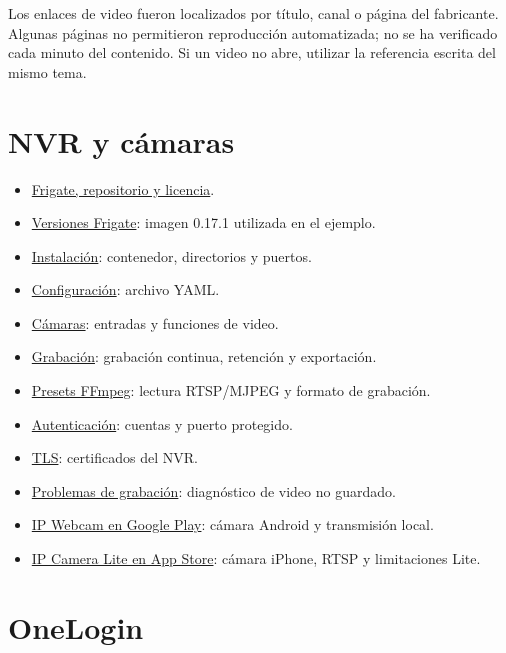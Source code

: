 \documentclass[12pt,a4paper]{article}
\begin{document}
Los enlaces de video fueron localizados por título, canal o página del fabricante. Algunas páginas no permitieron reproducción automatizada; no se ha verificado cada minuto del contenido. Si un video no abre, utilizar la referencia escrita del mismo tema.\par
{}\section*{NVR y cámaras}
\begin{itemize}
\item \href{https://github.com/blakeblackshear/frigate}{Frigate, repositorio y licencia}.
\item \href{https://github.com/blakeblackshear/frigate/releases}{Versiones Frigate}: imagen 0.17.1 utilizada en el ejemplo.
\item \href{https://docs.frigate.video/frigate/installation/}{Instalación}: contenedor, directorios y puertos.
\item \href{https://docs.frigate.video/configuration/config/}{Configuración}: archivo YAML.
\item \href{https://docs.frigate.video/configuration/cameras/}{Cámaras}: entradas y funciones de video.
\item \href{https://docs.frigate.video/configuration/record/}{Grabación}: grabación continua, retención y exportación.
\item \href{https://docs.frigate.video/configuration/ffmpeg_presets/}{Presets FFmpeg}: lectura RTSP/MJPEG y formato de grabación.
\item \href{https://docs.frigate.video/configuration/authentication/}{Autenticación}: cuentas y puerto protegido.
\item \href{https://docs.frigate.video/configuration/tls/}{TLS}: certificados del NVR.
\item \href{https://docs.frigate.video/troubleshooting/recordings/}{Problemas de grabación}: diagnóstico de video no guardado.
\item \href{https://play.google.com/store/apps/details?id=com.pas.webcam}{IP Webcam en Google Play}: cámara Android y transmisión local.
\item \href{https://apps.apple.com/us/app/ip-camera-lite/id1013455241}{IP Camera Lite en App Store}: cámara iPhone, RTSP y limitaciones Lite.
\end{itemize}
\section*{OneLogin}
\end{document}
